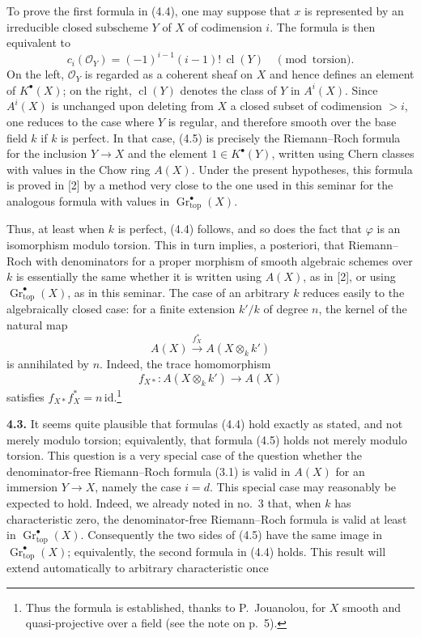 \documentclass[11pt]{article}
\newcommand{\Gtop}{\operatorname{Gr}_{\mathrm{top}}}
\newcommand{\cl}{\operatorname{cl}}
\newcommand{\id}{\mathrm{id}}
\begin{document}
To prove the first formula in (4.4), one may suppose that $x$ is represented
by an irreducible closed subscheme $Y$ of $X$ of codimension $i$. The formula
is then equivalent to
\begin{equation*}\tag{4.5}
 c_i(\mathcal O_Y)=(-1)^{i-1}(i-1)!\,\cl(Y)
   \quad\pmod{\text{torsion}}.
\end{equation*}
On the left, $\mathcal O_Y$ is regarded as a coherent sheaf on $X$ and hence
defines an element of $K^\bullet(X)$; on the right, $\cl(Y)$ denotes the
class of $Y$ in $A^i(X)$. Since $A^i(X)$ is unchanged upon deleting from
$X$ a closed subset of codimension $>i$, one reduces to the case where $Y$
is regular, and therefore smooth over the base field $k$ if $k$ is perfect.
In that case, (4.5) is precisely the Riemann--Roch formula for the inclusion
$Y\to X$ and the element $1\in K^\bullet(Y)$, written using Chern classes
with values in the Chow ring $A(X)$. Under the present hypotheses, this
formula is proved in [2] by a method very close to the one used in this
seminar for the analogous formula with values in $\Gtop^\bullet(X)$.

Thus, at least when $k$ is perfect, (4.4) follows, and so does the fact that
$\varphi$ is an isomorphism modulo torsion. This in turn implies, a
posteriori, that Riemann--Roch with denominators for a proper morphism of
smooth algebraic schemes over $k$ is essentially the same whether it is
written using $A(X)$, as in [2], or using $\Gtop^\bullet(X)$, as in this
seminar. The case of an arbitrary $k$ reduces easily to the algebraically
closed case: for a finite extension $k'/k$ of degree $n$, the kernel of the
natural map
\[
 A(X)\xrightarrow{f_X^*}A(X\otimes_k k')
\]
is annihilated by $n$. Indeed, the trace homomorphism
\[
 f_{X*}:A(X\otimes_k k')\longrightarrow A(X)
\]
satisfies $f_{X*}f_X^*=n\,\id$.\footnote{Thus the formula is established,
thanks to P.~Jouanolou, for $X$ smooth and quasi-projective over a field (see
the note on p.~5).}

\noindent\textbf{4.3.}
It seems quite plausible that formulas (4.4) hold exactly as stated, and not
merely modulo torsion; equivalently, that formula (4.5) holds not merely
modulo torsion. This question is a very special case of the question whether
the denominator-free Riemann--Roch formula (3.1) is valid in $A(X)$ for an
immersion $Y\to X$, namely the case $i=d$. This special case may reasonably
be expected to hold. Indeed, we already noted in no.~3 that, when $k$ has
characteristic zero, the denominator-free Riemann--Roch formula is valid at
least in $\Gtop^\bullet(X)$. Consequently the two sides of (4.5) have the
same image in $\Gtop^\bullet(X)$; equivalently, the second formula in (4.4)
holds. This result will extend automatically to arbitrary characteristic
once
\end{document}
